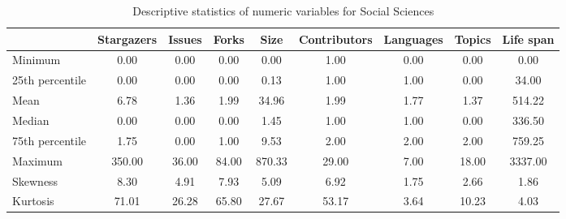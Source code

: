 \begin{table}
\centering
\caption{Descriptive statistics of numeric variables for Social Sciences}
\label{tab:Social_Sciences}
\begin{tabular}{lcccccccc}
\toprule
{} &  Stargazers &  Issues &  Forks &    Size &  Contributors &  Languages &  Topics &  Life span \\
\midrule
Minimum         &        0.00 &    0.00 &   0.00 &    0.00 &          1.00 &       0.00 &    0.00 &       0.00 \\
25th percentile &        0.00 &    0.00 &   0.00 &    0.13 &          1.00 &       1.00 &    0.00 &      34.00 \\
Mean            &        6.78 &    1.36 &   1.99 &   34.96 &          1.99 &       1.77 &    1.37 &     514.22 \\
Median          &        0.00 &    0.00 &   0.00 &    1.45 &          1.00 &       1.00 &    0.00 &     336.50 \\
75th percentile &        1.75 &    0.00 &   1.00 &    9.53 &          2.00 &       2.00 &    2.00 &     759.25 \\
Maximum         &      350.00 &   36.00 &  84.00 &  870.33 &         29.00 &       7.00 &   18.00 &    3337.00 \\
Skewness        &        8.30 &    4.91 &   7.93 &    5.09 &          6.92 &       1.75 &    2.66 &       1.86 \\
Kurtosis        &       71.01 &   26.28 &  65.80 &   27.67 &         53.17 &       3.64 &   10.23 &       4.03 \\
\bottomrule
\end{tabular}
\end{table}
